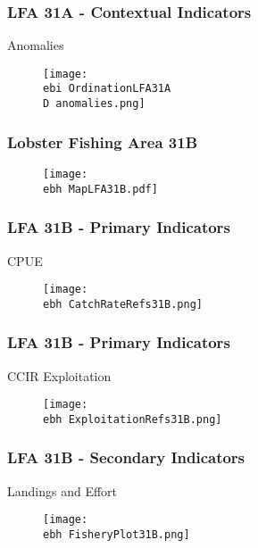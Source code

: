 \documentclass{beamer}
\newcommand{\ebh}{\string~/bio.data/bio.lobster/figures/Assessment/LFA2732/} %
\newcommand{\ebi}{\string~/bio.data/bio.lobster/figures/Assessment/Indicators/} %
\newcommand{\D}{.}
\begin{document}
\begin{frame}
\frametitle{LFA 31A - Contextual Indicators}
Anomalies
\begin{figure}
        \begin{center}
            \texttt{[image: \\ebi OrdinationLFA31A\\D anomalies.png]}
        \end{center}
    \end{figure}
\end{frame}







\begin{frame}
\frametitle{Lobster Fishing Area 31B}
\begin{figure}
        \begin{center}
            \texttt{[image: \\ebh MapLFA31B.pdf]}
        \end{center}
    \end{figure}
\end{frame}


\begin{frame}
\frametitle{LFA 31B - Primary Indicators}
CPUE
\begin{figure}
        \begin{center}
            \texttt{[image: \\ebh CatchRateRefs31B.png]}
        \end{center}
    \end{figure}
\end{frame}



\begin{frame}
\frametitle{LFA 31B - Primary Indicators}
CCIR Exploitation 
\begin{figure}
        \begin{center}
            \texttt{[image: \\ebh ExploitationRefs31B.png]}
        \end{center}
    \end{figure}
\end{frame}




\begin{frame}
\frametitle{LFA 31B - Secondary Indicators}
Landings and Effort
\begin{figure}
        \begin{center}
            \texttt{[image: \\ebh FisheryPlot31B.png]}
        \end{center}
    \end{figure}
\end{frame}
\end{document}
